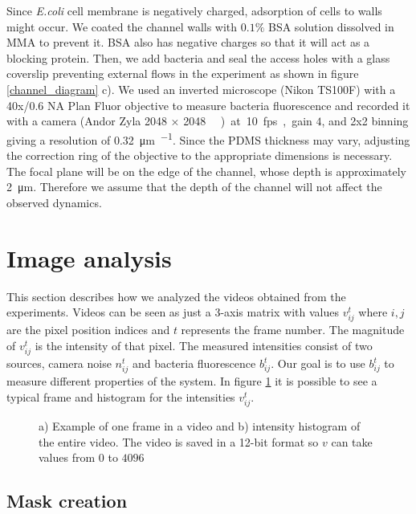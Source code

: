 Since \textit{E.coli} cell membrane is negatively charged, adsorption of cells to walls might occur. We coated the channel walls with $0.1\%$ BSA solution dissolved in MMA to prevent it. BSA also has negative charges so that it will act as a blocking protein. Then, we add bacteria and seal the access holes with a glass coverslip preventing external flows in the experiment as shown in figure \ref{channel_diagram} c). We used an inverted microscope (Nikon TS100F) with a 40x/0.6 NA Plan Fluor objective to measure bacteria fluorescence and recorded it with a camera (Andor Zyla 2048 × 2048 \SI{}{\square\pixels}) at 10 fps, gain $4$, and 2x2 binning giving a resolution of \SI[per-mode = symbol]{0.32}{\micro\meter\per\pixels}. Since the PDMS thickness may vary, adjusting the correction ring of the objective to the appropriate dimensions is necessary. The focal plane will be on the edge of the channel, whose depth is approximately \SI{2}{\micro\meter}. Therefore we assume that the depth of the channel will not affect the observed dynamics.

\section{Image analysis}


This section describes how we analyzed the videos obtained from the experiments. Videos can be seen as just a 3-axis matrix with values $v_{ij}^t$ where $i,j$ are the pixel position indices and $t$ represents the frame number. The magnitude of $v_{ij}^t$ is the intensity of that pixel. The measured intensities consist of two sources, camera noise $n_{ij}^t$ and bacteria fluorescence $b_{ij}^t$. Our goal is to use $b_{ij}^t$ to measure different properties of the system. In figure \ref{video_histogram} it is possible to see a typical frame and histogram for the intensities $v_{ij}^t$.

\begin{figure}
	\centering
	
	\caption[Typical video frame]{a) Example of one frame in a video and b) intensity histogram of the entire video. The video is saved in a 12-bit format so $v$ can take values from $0$ to $4096$ }
	\label{video_histogram}
\end{figure}


\subsection{Mask creation}

